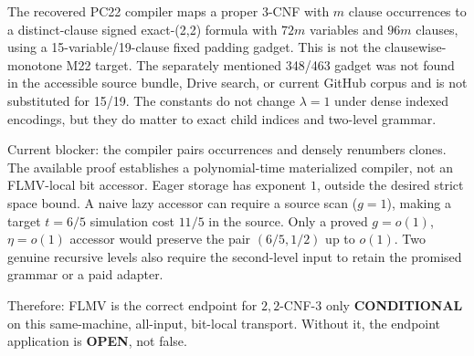 \documentclass[11pt]{article}
\newcommand{\cond}{\textbf{CONDITIONAL}}
\newcommand{\openstatus}{\textbf{OPEN}}
\begin{document}
The recovered PC22 compiler maps a proper 3-CNF with $m$ clause occurrences to a
distinct-clause signed exact-(2,2) formula with $72m$ variables and $96m$ clauses,
using a 15-variable/19-clause fixed padding gadget.  This is not the clausewise-monotone
M22 target.  The separately mentioned 348/463 gadget was not found in the accessible
source bundle, Drive search, or current GitHub corpus and is not substituted for 15/19.
The constants do not change $\lambda=1$ under dense indexed encodings, but they do
matter to exact child indices and two-level grammar.

Current blocker: the compiler pairs occurrences and densely renumbers clones.  The
available proof establishes a polynomial-time materialized compiler, not an FLMV-local
bit accessor.  Eager storage has exponent $1$, outside the desired strict space bound.
A naive lazy accessor can require a source scan ($g=1$), making a target $t=6/5$
simulation cost $11/5$ in the source.  Only a proved $g=o(1)$, $\eta=o(1)$ accessor
would preserve the pair $(6/5,1/2)$ up to $o(1)$.  Two genuine recursive levels also
require the second-level input to retain the promised grammar or a paid adapter.

Therefore: FLMV is the correct endpoint for $2,2$-CNF-3 only \cond{} on this
same-machine, all-input, bit-local transport.  Without it, the endpoint application is
\openstatus, not false.
\end{document}
